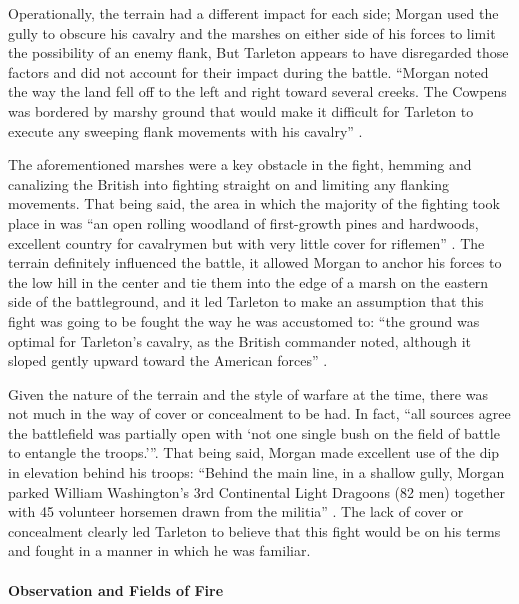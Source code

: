Operationally, the terrain had a different impact for each side; Morgan used
the gully to obscure his cavalry and the marshes on either side of his forces
to limit the possibility of an enemy flank, But Tarleton appears to have
disregarded those factors and did not account for their impact during the
battle.  ``Morgan noted the way the land fell off to the left and right toward
several creeks.  The Cowpens was bordered by marshy ground that would make it
difficult for Tarleton to execute any sweeping flank movements with his
cavalry'' \cite[45]{fleming_cowpens_1988}.

The aforementioned marshes were a key obstacle in the fight, hemming and
canalizing the British into fighting straight on and limiting any flanking
movements.  That being said, the area in which the majority of the fighting
took place in was ``an open rolling woodland of first-growth pines and
hardwoods, excellent country for cavalrymen but with very little cover for
riflemen'' \cite[124]{lumpkin_savannah_1981}.  The terrain definitely
influenced the battle, it allowed Morgan to anchor his forces to the low hill
in the center and tie them into the edge of a marsh on the eastern side of the
battleground, and it led Tarleton to make an assumption that this fight was
going to be fought the way he was accustomed to: ``the ground was optimal for
Tarleton's cavalry, as the British commander noted, although it sloped gently
upward toward the American forces'' \cite[46]{moncure_cowpens_1996}.

Given the nature of the terrain and the style of warfare at the time, there was
not much in the way of cover or concealment to be had.  In fact, ``all sources
agree the battlefield was partially open with `not one single bush on the field
of battle to entangle the troops.'''\cite[66]{babits_devil_2001}. That being
said, Morgan made excellent use of the dip in elevation behind his troops:
``Behind the main line, in a shallow gully, Morgan parked William Washington's
3rd Continental Light Dragoons (82 men) together with 45 volunteer horsemen
drawn from the militia'' \cite[327]{stephenson_patriot_2007}.  The lack of
cover or concealment clearly led Tarleton to believe that this fight would be
on his terms and fought in a manner in which he was familiar.  


\paragraph{Observation and Fields of Fire}

